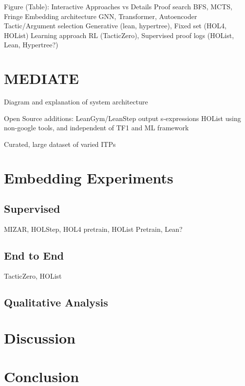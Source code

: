 \documentclass[letterpaper]{article} %
\begin{document}
Figure (Table):
Interactive Approaches vs Details
Proof search
BFS, MCTS, Fringe
Embedding architecture
GNN, Transformer, Autoencoder
Tactic/Argument selection
Generative (lean, hypertree), Fixed set (HOL4, HOList)
Learning approach
RL (TacticZero), Supervised proof logs (HOList, Lean, Hypertree?)

\section{MEDIATE}
Diagram and explanation of system architecture

Open Source additions:
LeanGym/LeanStep output s-expressions
HOList using non-google tools, and independent of TF1 and ML framework

Curated, large dataset of varied ITPs

\section{Embedding Experiments}
\subsection{Supervised}
MIZAR, HOLStep, HOL4 pretrain, HOList Pretrain, Lean?
\subsection{End to End}
TacticZero, HOList
\subsection{Qualitative Analysis}
\section{Discussion}
\section{Conclusion}
\end{document}
